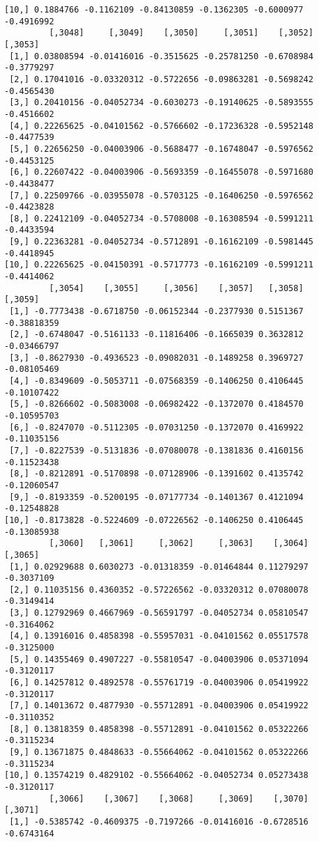 \documentclass[
  letterpaper,
  DIV=11,
  numbers=noendperiod]{scrreprt}
\begin{document}
\begin{verbatim}
[10,] 0.1884766 -0.1162109 -0.84130859 -0.1362305 -0.6000977 -0.4916992
         [,3048]     [,3049]    [,3050]     [,3051]    [,3052]    [,3053]
 [1,] 0.03808594 -0.01416016 -0.3515625 -0.25781250 -0.6708984 -0.3779297
 [2,] 0.17041016 -0.03320312 -0.5722656 -0.09863281 -0.5698242 -0.4565430
 [3,] 0.20410156 -0.04052734 -0.6030273 -0.19140625 -0.5893555 -0.4516602
 [4,] 0.22265625 -0.04101562 -0.5766602 -0.17236328 -0.5952148 -0.4477539
 [5,] 0.22656250 -0.04003906 -0.5688477 -0.16748047 -0.5976562 -0.4453125
 [6,] 0.22607422 -0.04003906 -0.5693359 -0.16455078 -0.5971680 -0.4438477
 [7,] 0.22509766 -0.03955078 -0.5703125 -0.16406250 -0.5976562 -0.4423828
 [8,] 0.22412109 -0.04052734 -0.5708008 -0.16308594 -0.5991211 -0.4433594
 [9,] 0.22363281 -0.04052734 -0.5712891 -0.16162109 -0.5981445 -0.4418945
[10,] 0.22265625 -0.04150391 -0.5717773 -0.16162109 -0.5991211 -0.4414062
         [,3054]    [,3055]     [,3056]    [,3057]   [,3058]     [,3059]
 [1,] -0.7773438 -0.6718750 -0.06152344 -0.2377930 0.5151367 -0.38818359
 [2,] -0.6748047 -0.5161133 -0.11816406 -0.1665039 0.3632812 -0.03466797
 [3,] -0.8627930 -0.4936523 -0.09082031 -0.1489258 0.3969727 -0.08105469
 [4,] -0.8349609 -0.5053711 -0.07568359 -0.1406250 0.4106445 -0.10107422
 [5,] -0.8266602 -0.5083008 -0.06982422 -0.1372070 0.4184570 -0.10595703
 [6,] -0.8247070 -0.5112305 -0.07031250 -0.1372070 0.4169922 -0.11035156
 [7,] -0.8227539 -0.5131836 -0.07080078 -0.1381836 0.4160156 -0.11523438
 [8,] -0.8212891 -0.5170898 -0.07128906 -0.1391602 0.4135742 -0.12060547
 [9,] -0.8193359 -0.5200195 -0.07177734 -0.1401367 0.4121094 -0.12548828
[10,] -0.8173828 -0.5224609 -0.07226562 -0.1406250 0.4106445 -0.13085938
         [,3060]   [,3061]     [,3062]     [,3063]    [,3064]    [,3065]
 [1,] 0.02929688 0.6030273 -0.01318359 -0.01464844 0.11279297 -0.3037109
 [2,] 0.11035156 0.4360352 -0.57226562 -0.03320312 0.07080078 -0.3149414
 [3,] 0.12792969 0.4667969 -0.56591797 -0.04052734 0.05810547 -0.3164062
 [4,] 0.13916016 0.4858398 -0.55957031 -0.04101562 0.05517578 -0.3125000
 [5,] 0.14355469 0.4907227 -0.55810547 -0.04003906 0.05371094 -0.3120117
 [6,] 0.14257812 0.4892578 -0.55761719 -0.04003906 0.05419922 -0.3120117
 [7,] 0.14013672 0.4877930 -0.55712891 -0.04003906 0.05419922 -0.3110352
 [8,] 0.13818359 0.4858398 -0.55712891 -0.04101562 0.05322266 -0.3115234
 [9,] 0.13671875 0.4848633 -0.55664062 -0.04101562 0.05322266 -0.3115234
[10,] 0.13574219 0.4829102 -0.55664062 -0.04052734 0.05273438 -0.3120117
         [,3066]    [,3067]    [,3068]     [,3069]    [,3070]    [,3071]
 [1,] -0.5385742 -0.4609375 -0.7197266 -0.01416016 -0.6728516 -0.6743164

\end{verbatim}
\end{document}

